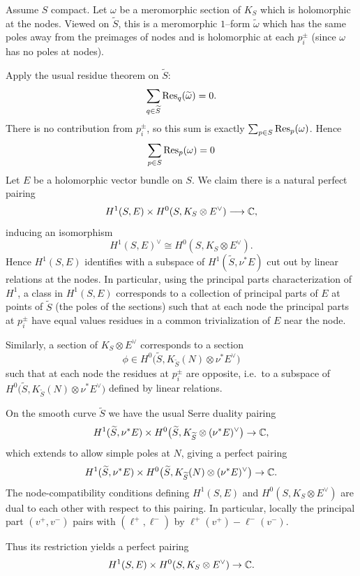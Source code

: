 \documentclass[12pt]{article}
\begin{document}
\begin{solution}
Assume $S$ compact. Let $\omega$ be a meromorphic section of $K_S$ which is
holomorphic at the nodes. Viewed on $\widetilde S$, this is a meromorphic
$1$--form $\widetilde\omega$ which has the same poles away from the preimages of nodes and is holomorphic at each $p_i^\pm$ (since $\omega$ has no poles at nodes).

Apply the usual residue theorem on $\widetilde S$:
\[
\sum_{q\in\widetilde S} \operatorname{Res}_q(\widetilde\omega)=0.
\]
There is no contribution from $p_i^\pm$, so this sum is exactly
$\sum_{p\in S}\operatorname{Res}_p(\omega)$. Hence
\[
\sum_{p\in S} \operatorname{Res}_p(\omega)=0
\]
Let $E$ be a holomorphic vector bundle on $S$.
We claim there is a natural perfect pairing
\[
H^1(S,E)\times H^0(S,K_S\otimes E^\vee)\longrightarrow\mathbb{C},
\]
inducing an isomorphism
\[
H^1(S,E)^\vee \cong H^0(S,K_S\otimes E^\vee).
\]
Hence $H^1(S,E)$ identifies with a
subspace of $H^1(\widetilde S,\nu^*E)$ cut out by linear relations at the nodes. In particular, using the principal parts characterization of $H^1$, a class in $H^1(S,E)$ corresponds to a collection of principal parts of $E$ at points of $\widetilde S$ (the poles of the sections) such that at each node the principal parts at $p_i^\pm$ have equal values residues in a common trivialization of $E$ near the node. 

Similarly, a section of $K_S\otimes E^\vee$ corresponds to a section
\[
\phi\in H^0\big(\widetilde S,K_{\widetilde S}(N)\otimes\nu^*E^\vee\big)
\]
such that at each node the residues at $p_i^\pm$ are opposite, i.e.\ to a
subspace of $H^0\big(\widetilde S,K_{\widetilde S}(N)\otimes\nu^*E^\vee\big)$
defined by linear relations.

On the smooth curve $\widetilde S$ we have the usual Serre duality pairing
\[
H^1(\widetilde S,\nu^*E)\times
H^0\big(\widetilde S,K_{\widetilde S}\otimes(\nu^*E)^\vee\big)
\to\mathbb{C},
\]
which extends to allow simple poles at $N$, giving a perfect pairing
\[
H^1(\widetilde S,\nu^*E)\times
H^0\big(\widetilde S,K_{\widetilde S}(N)\otimes(\nu^*E)^\vee\big)
\to\mathbb{C}.
\]
The node-compatibility conditions defining $H^1(S,E)$ and $H^0(S,K_S\otimes
E^\vee)$ are dual to each other with respect to this pairing. In particular, locally the principal part $(v^+,v^-)$ pairs with $(\ell^+,\ell^-)$ by
$\ell^+(v^+)-\ell^-(v^-)$.

Thus its restriction yields a perfect pairing
\[
H^1(S,E)\times H^0(S,K_S\otimes E^\vee)\to\mathbb{C}.
\]
\end{solution}
\end{document}
